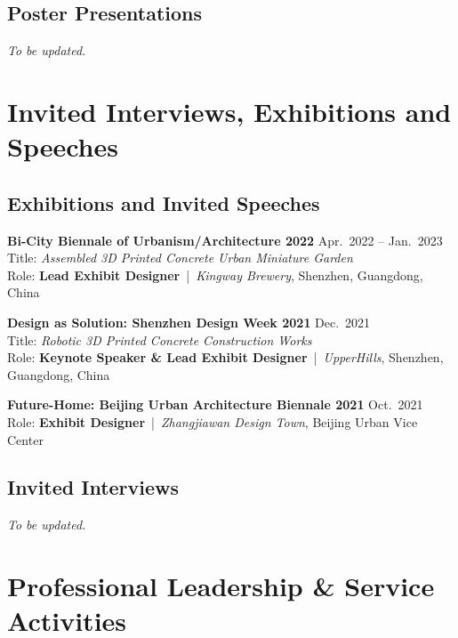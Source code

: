 \documentclass[11pt,a4paper]{article}
\newcommand{\entrytitle}[1]{\textbf{#1}}
\newcommand{\entrydetail}[1]{\textit{#1}}
\begin{document}
\subsection*{Poster Presentations}

\textit{To be updated.}

\section{Invited Interviews, Exhibitions and Speeches}

\subsection*{Exhibitions and Invited Speeches}

\entrytitle{Bi-City Biennale of Urbanism/Architecture 2022} \hfill Apr.\ 2022 -- Jan.\ 2023 \\
Title: \entrydetail{Assembled 3D Printed Concrete Urban Miniature Garden} \\
Role: \textbf{Lead Exhibit Designer} \,|\, \entrydetail{Kingway Brewery}, Shenzhen, Guangdong, China

\entrytitle{Design as Solution: Shenzhen Design Week 2021} \hfill Dec.\ 2021 \\
Title: \entrydetail{Robotic 3D Printed Concrete Construction Works} \\
Role: \textbf{Keynote Speaker \& Lead Exhibit Designer} \,|\, \entrydetail{UpperHills}, Shenzhen, Guangdong, China

\entrytitle{Future-Home: Beijing Urban Architecture Biennale 2021} \hfill Oct.\ 2021 \\
Role: \textbf{Exhibit Designer} \,|\, \entrydetail{Zhangjiawan Design Town}, Beijing Urban Vice Center

\subsection*{Invited Interviews}

\textit{To be updated.}

\section{Professional Leadership \& Service Activities }
\end{document}
